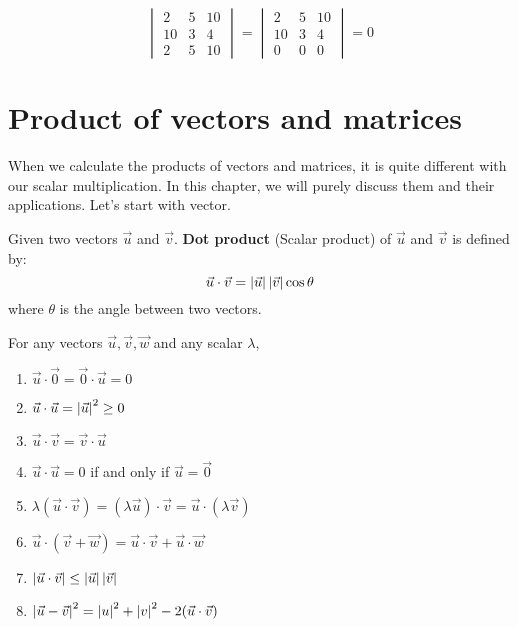 \documentclass{huhtakm-template-book}
\begin{document}
\begin{eg}
    \begin{equation*}
        \begin{vmatrix}
            2 & 5 & 10\\
            10 & 3 & 4\\
            2 & 5 & 10
        \end{vmatrix}=\begin{vmatrix}
            2 & 5 & 10\\
            10 & 3 & 4\\
            0 & 0 & 0
        \end{vmatrix}=0
    \end{equation*}
\end{eg}

\chapter{Product of vectors and matrices}
When we calculate the products of vectors and matrices, it is quite different with our scalar multiplication. In this chapter, we will purely discuss them and their applications. Let's start with vector.
\begin{defn}
    Given two vectors $\vec{u}$ and $\vec{v}$. \textbf{Dot product} (Scalar product) of $\vec{u}$ and $\vec{v}$ is defined by:
    \begin{equation*}
        \vec{u}\cdot\vec{v}=\left|{\vec{u}}\right|\left|{\vec{v}}\right|\cos\theta
    \end{equation*}
    where $\theta$ is the angle between two vectors.
\end{defn}
\begin{lem}
    For any vectors $\vec{u},\vec{v},\vec{w}$ and any scalar $\lambda$,
    \begin{enumerate}
        \item $\vec{u}\cdot\vec{0}=\vec{0}\cdot\vec{u}=0$
        \item $\vec{u}\cdot\vec{u}=\left|{\vec{u}}\right|^{2}\geq 0$
        \item $\vec{u}\cdot\vec{v}=\vec{v}\cdot\vec{u}$
        \item $\vec{u}\cdot\vec{u}=0$ if and only if $\vec{u}=\vec{0}$
        \item $\lambda(\vec{u}\cdot\vec{v})=(\lambda\vec{u})\cdot\vec{v}=\vec{u}\cdot(\lambda\vec{v})$
        \item $\vec{u}\cdot(\vec{v}+\vec{w})=\vec{u}\cdot\vec{v}+\vec{u}\cdot\vec{w}$
        \item $\left|{\vec{u}\cdot\vec{v}}\right|\leq\left|{\vec{u}}\right|\left|{\vec{v}}\right|$
        \item $\left|{\vec{u}-\vec{v}}\right|^{2}=\left|{u}\right|^{2}+\left|{v}\right|^{2}-2(\vec{u}\cdot\vec{v})$
    \end{enumerate}
\end{lem}
\end{document}

